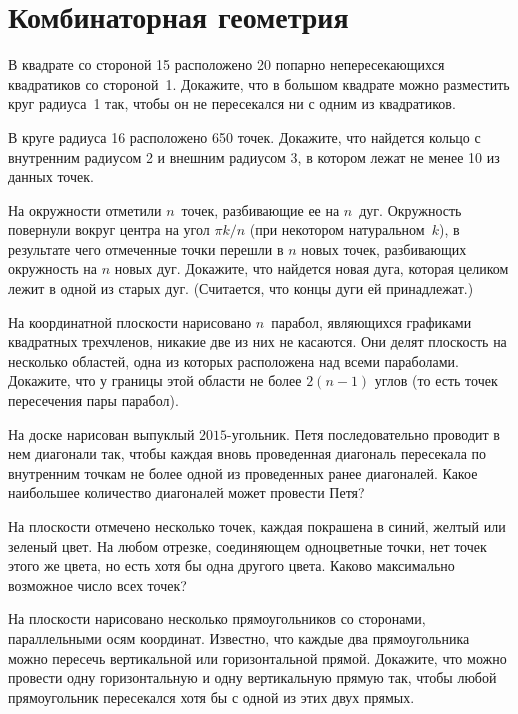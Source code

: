
\section*{Комбинаторная геометрия}


\begin{problems}

\item
В квадрате со стороной 15 расположено 20 попарно непересекающихся квадратиков
со стороной~1.
Докажите, что в большом квадрате можно разместить круг радиуса~1 так, чтобы
он не пересекался ни с одним из квадратиков.

\item
В круге радиуса 16 расположено 650 точек.
Докажите, что найдется кольцо с внутренним радиусом 2 и внешним радиусом 3,
в котором лежат не менее 10 из данных точек.

\item
На окружности отметили $n$~точек, разбивающие ее на $n$~дуг.
Окружность повернули вокруг центра на угол $\pi k / n$ (при некотором
натуральном~$k$), в результате чего отмеченные точки перешли в $n$ новых точек,
разбивающих окружность на $n$ новых дуг.
Докажите, что найдется новая дуга, которая целиком лежит в одной из старых дуг.
(Считается, что концы дуги ей принадлежат.)

\item
На координатной плоскости нарисовано $n$~парабол, являющихся графиками
квадратных трехчленов, никакие две из них не касаются.
Они делят плоскость на несколько областей, одна из которых расположена над
всеми параболами.
Докажите, что у границы этой области не более $2 (n - 1)$ углов (то есть точек
пересечения пары парабол).

\item
На доске нарисован выпуклый $2015$-угольник.
Петя последовательно проводит в нем диагонали так, чтобы каждая вновь
проведенная диагональ пересекала по внутренним точкам не более одной
из проведенных ранее диагоналей.
Какое наибольшее количество диагоналей может провести Петя?

\item
На плоскости отмечено несколько точек, каждая покрашена в синий, желтый или
зеленый цвет.
На любом отрезке, соединяющем одноцветные точки, нет точек этого же цвета,
но есть хотя бы одна другого цвета.
Каково максимально возможное число всех точек?

\item
На плоскости нарисовано несколько прямоугольников со сторонами, параллельными
осям координат.
Известно, что каждые два прямоугольника можно пересечь вертикальной или
горизонтальной прямой.
Докажите, что можно провести одну горизонтальную и одну вертикальную прямую
так, чтобы любой прямоугольник пересекался хотя бы с одной из этих двух прямых.

\end{problems}

